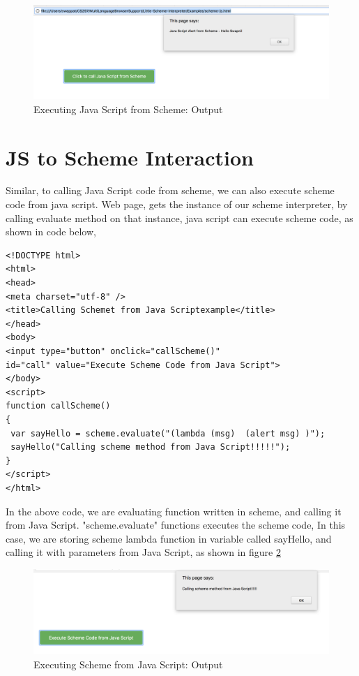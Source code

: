 \begin{figure}[H]
	\begin{center}
		\includegraphics[width=\linewidth]{./images/scheme-js-interaction.png}
	\end{center}
	\caption{Executing Java Script from Scheme: Output}
	\label{fig:scheme-js-interaction}
\end{figure}


\section{JS to Scheme Interaction}

Similar, to calling Java Script code from scheme, we can also execute scheme code from java script. Web page, gets the instance of our scheme interpreter, by calling evaluate method on that instance, java script can execute scheme code, as shown in code below, 

\begin{lstlisting}[frame=single]
<!DOCTYPE html>
<html>
<head>
<meta charset="utf-8" />
<title>Calling Schemet from Java Scriptexample</title>
</head>
<body>
<input type="button" onclick="callScheme()" 
id="call" value="Execute Scheme Code from Java Script">
</body>
<script>
function callScheme()
{
 var sayHello = scheme.evaluate("(lambda (msg)  (alert msg) )");
 sayHello("Calling scheme method from Java Script!!!!!");
}
</script>
</html>
\end{lstlisting}

In the above code, we are evaluating function written in scheme, and calling it from Java Script. "scheme.evaluate" functions executes the scheme code, In this case, we are storing scheme lambda function in variable called sayHello, and calling it with parameters from Java Script, as shown in figure \ref{fig:js-scheme-interaction}

\begin{figure}[H]
	\begin{center}
		\includegraphics[width=\linewidth]{./images/js-scheme-interaction.png}
	\end{center}
	\caption{Executing Scheme from Java Script: Output}
	\label{fig:js-scheme-interaction}
\end{figure}



